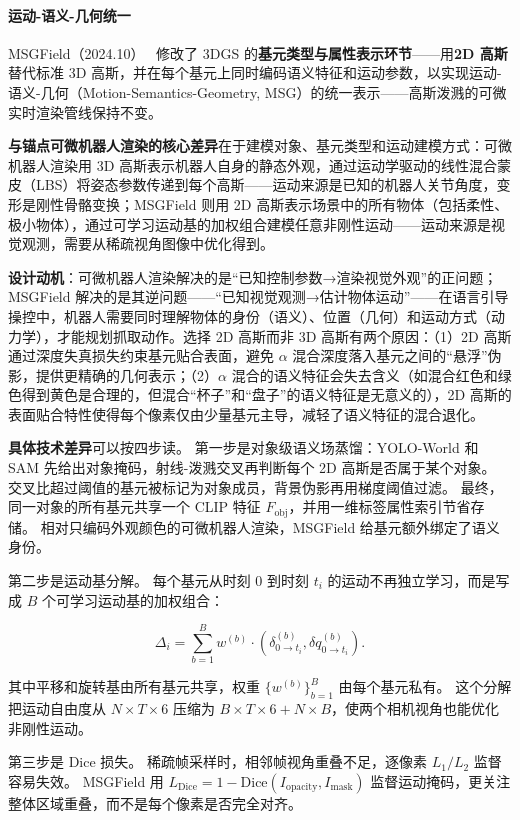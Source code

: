 \paragraph{运动-语义-几何统一}

MSGField（2024.10）~\cite{2410_15730} 修改了 3DGS 的\textbf{基元类型与属性表示环节}——用\textbf{2D 高斯}替代标准 3D 高斯，并在每个基元上同时编码语义特征和运动参数，以实现运动-语义-几何（Motion-Semantics-Geometry, MSG）的统一表示——高斯泼溅的可微实时渲染管线保持不变。

\textbf{与锚点可微机器人渲染的核心差异}在于建模对象、基元类型和运动建模方式：可微机器人渲染用 3D 高斯表示机器人自身的静态外观，通过运动学驱动的线性混合蒙皮（LBS）将姿态参数传递到每个高斯——运动来源是已知的机器人关节角度，变形是刚性骨骼变换；MSGField 则用 2D 高斯表示场景中的所有物体（包括柔性、极小物体），通过可学习运动基的加权组合建模任意非刚性运动——运动来源是视觉观测，需要从稀疏视角图像中优化得到。

\textbf{设计动机}：可微机器人渲染解决的是``已知控制参数→渲染视觉外观''的正问题；MSGField 解决的是其逆问题——``已知视觉观测→估计物体运动''——在语言引导操控中，机器人需要同时理解物体的身份（语义）、位置（几何）和运动方式（动力学），才能规划抓取动作。选择 2D 高斯而非 3D 高斯有两个原因：（1）2D 高斯通过深度失真损失约束基元贴合表面，避免 $\alpha$ 混合深度落入基元之间的``悬浮''伪影，提供更精确的几何表示；（2）$\alpha$ 混合的语义特征会失去含义（如混合红色和绿色得到黄色是合理的，但混合``杯子''和``盘子''的语义特征是无意义的），2D 高斯的表面贴合特性使得每个像素仅由少量基元主导，减轻了语义特征的混合退化。

\textbf{具体技术差异}可以按四步读。
第一步是对象级语义场蒸馏：YOLO-World 和 SAM 先给出对象掩码，射线-泼溅交叉再判断每个 2D 高斯是否属于某个对象。
交叉比超过阈值的基元被标记为对象成员，背景伪影再用梯度阈值过滤。
最终，同一对象的所有基元共享一个 CLIP 特征 $F_\text{obj}$，并用一维标签属性索引节省存储。
相对只编码外观颜色的可微机器人渲染，MSGField 给基元额外绑定了语义身份。

第二步是运动基分解。
每个基元从时刻 $0$ 到时刻 $t_i$ 的运动不再独立学习，而是写成 $B$ 个可学习运动基的加权组合：

\[
\Delta_i = \sum_{b=1}^B w^{(b)} \cdot (\delta^{(b)}_{0 \to t_i}, \delta q^{(b)}_{0 \to t_i}).
\]

其中平移和旋转基由所有基元共享，权重 $\{w^{(b)}\}_{b=1}^B$ 由每个基元私有。
这个分解把运动自由度从 $N \times T \times 6$ 压缩为 $B \times T \times 6 + N \times B$，使两个相机视角也能优化非刚性运动。

第三步是 Dice 损失。
稀疏帧采样时，相邻帧视角重叠不足，逐像素 $L_1/L_2$ 监督容易失效。
MSGField 用 $L_\text{Dice} = 1 - \text{Dice}(I_\text{opacity}, I_\text{mask})$ 监督运动掩码，更关注整体区域重叠，而不是每个像素是否完全对齐。

